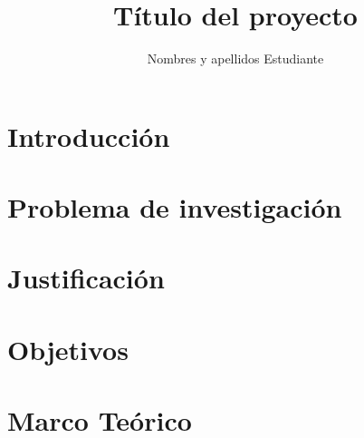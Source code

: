 \documentclass[12pt]{MIA-USA}
\title{T\'itulo del proyecto}
\author{Nombres y apellidos Estudiante}
\begin{document}
	
	\maketitle
	
	
	
    
	
    
    \tableofcontents
    \listoffigures
    \listoftables
    
    
    
    
    
    \chapter{Introducci\'on}
    

    \chapter{Problema de investigaci\'on}
    
    
    \chapter{Justificaci\'on}
    
    
    \chapter{Objetivos}
    

    \chapter{Marco Teórico}
    
    
\end{document}
